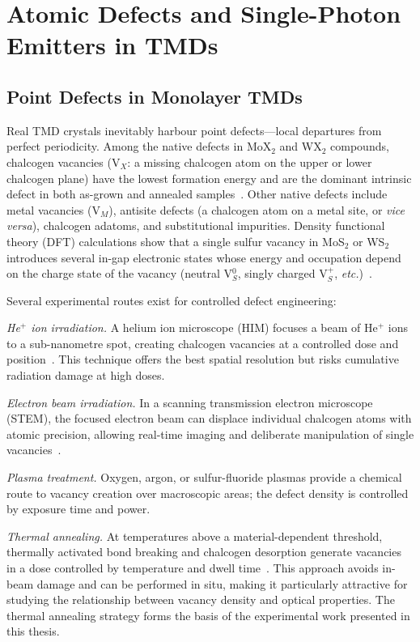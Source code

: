 \section{Atomic Defects and Single-Photon Emitters in TMDs}
\label{sec:defects_SPE}

\subsection{Point Defects in Monolayer TMDs}
\label{sub:chapKeyWord__subsection_3_1}

Real TMD crystals inevitably harbour point defects---local departures from perfect periodicity.
Among the native defects in MoX$_2$ and WX$_2$ compounds, chalcogen vacancies (V$_X$: a missing chalcogen atom on the upper or lower chalcogen plane) have the lowest formation energy and are the dominant intrinsic defect in both as-grown and annealed samples~\cite{komsa-2015}.
Other native defects include metal vacancies (V$_M$), antisite defects (a chalcogen atom on a metal site, or \textit{vice versa}), chalcogen adatoms, and substitutional impurities.
Density functional theory (DFT) calculations show that a single sulfur vacancy in MoS$_2$ or WS$_2$ introduces several in-gap electronic states whose energy and occupation depend on the charge state of the vacancy (neutral V$_S^0$, singly charged V$_S^+$, \textit{etc.})~\cite{komsa-2015}.

Several experimental routes exist for controlled defect engineering:

\textit{He$^+$ ion irradiation.}
A helium ion microscope (HIM) focuses a beam of He$^+$ ions to a sub-nanometre spot, creating chalcogen vacancies at a controlled dose and position~\cite{barthelmi2020atomistic}.
This technique offers the best spatial resolution but risks cumulative radiation damage at high doses.

\textit{Electron beam irradiation.}
In a scanning transmission electron microscope (STEM), the focused electron beam can displace individual chalcogen atoms with atomic precision, allowing real-time imaging and deliberate manipulation of single vacancies~\cite{noh-2014}.

\textit{Plasma treatment.}
Oxygen, argon, or sulfur-fluoride plasmas provide a chemical route to vacancy creation over macroscopic areas; the defect density is controlled by exposure time and power.

\textit{Thermal annealing.}
At temperatures above a material-dependent threshold, thermally activated bond breaking and chalcogen desorption generate vacancies in a dose controlled by temperature and dwell time~\cite{mitterreiter2021role}.
This approach avoids in-beam damage and can be performed in situ, making it particularly attractive for studying the relationship between vacancy density and optical properties.
The thermal annealing strategy forms the basis of the experimental work presented in this thesis.

